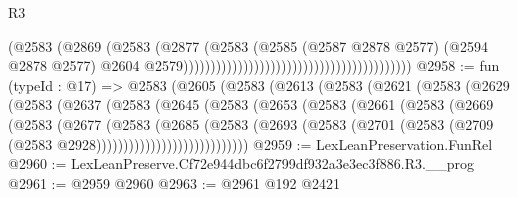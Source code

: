 \begin{lexlean}{R3}
\begin{coremodule}
                                                                            (@2583
                                                                              (@2869
                                                                                (@2583
                                                                                  (@2877
                                                                                    (@2583
                                                                                      (@2585
                                                                                        (@2587
                                                                                          @2878
                                                                                          @2577)
                                                                                        (@2594
                                                                                          @2878
                                                                                          @2577)
                                                                                        @2604
                                                                                        @2579))))))))))))))))))))))))))))))))))))))))))
@2958 := fun (typeId : @17) =>
  @2583
    (@2605
      (@2583
        (@2613
          (@2583
            (@2621
              (@2583
                (@2629
                  (@2583
                    (@2637
                      (@2583
                        (@2645
                          (@2583
                            (@2653
                              (@2583
                                (@2661
                                  (@2583
                                    (@2669
                                      (@2583
                                        (@2677
                                          (@2583
                                            (@2685
                                              (@2583
                                                (@2693
                                                  (@2583
                                                    (@2701
                                                      (@2583
                                                        (@2709
                                                          (@2583 @2928))))))))))))))))))))))))))))
@2959 := LexLeanPreservation.FunRel
@2960 := LexLeanPreserve.Cf72e944dbc6f2799df932a3e3ec3f886.R3.__prog
@2961 := @2959 @2960
@2963 := @2961 @192 @2421

\end{coremodule}
\end{lexlean}
